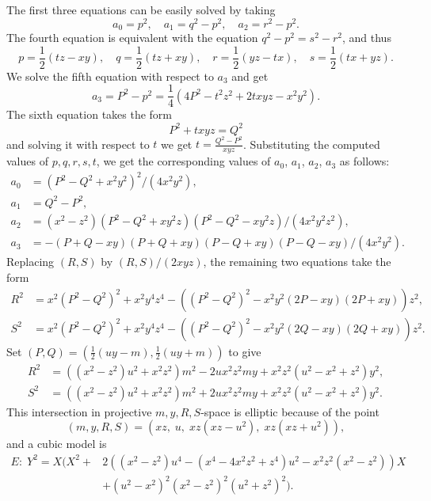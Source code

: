 \documentclass[10pt]{amsart}
\theoremstyle{plain}
\begin{document}
The first three equations can be easily solved by taking
$$
a_{0}=p^2, \quad a_{1}=q^2-p^2,\quad a_{2}=r^2-p^2.
$$
The fourth equation is equivalent with the equation $q^2-p^2=s^2-r^2$, and thus
$$
p=\frac{1}{2} (t z-x y),\quad q=\frac{1}{2} (t z+x y),\quad r=\frac{1}{2} (y z-t x),\quad s=\frac{1}{2} (t x+y z).
$$
We solve the fifth equation with respect to $a_{3}$ and get
$$
a_{3}=P^2-p^2=\frac{1}{4} \left(4 P^2-t^2 z^2+2 t x y z-x^2 y^2\right).
$$
The sixth equation takes the form
$$
P^2 + t x y z = Q^2
$$
and solving it with respect to $t$ we get $t=\frac{Q^2-P^2}{x y z}$. Substituting the computed values of $p, q, r, s, t$,
we get the corresponding values of $a_0$, $a_1$, $a_2$, $a_3$ as follows:
\begin{equation}\label{a0a1a2a3}
\begin{aligned}
	a_0 & = (P^2-Q^2+x^2y^2)^2/(4 x^2 y^2), \\
	a_1 & = Q^2-P^2, \\
	a_2 & = (x^2-z^2)(P^2-Q^2+x y^2 z)(P^2-Q^2-x y^2 z)/(4 x^2 y^2 z^2), \\
	a_3 & = -(P+Q-x y)(P+Q+x y)(P-Q+x y)(P-Q-x y)/(4 x^2y^2).
\end{aligned}
\end{equation}
Replacing 
$(R,S)$ by $(R,S)/(2 x y z)$, the remaining two equations take the form
\begin{equation}\label{sysRS}
\begin{aligned}
	R^2 & = x^2(P^2-Q^2)^2 + x^2y^4z^4 - ((P^2-Q^2)^2-x^2 y^2(2P-x y)(2P+x y
)) z^2, \\
	S^2 & = x^2(P^2-Q^2)^2 + x^2y^4z^4 - ((P^2-Q^2)^2-x^2 y^2(2Q-x y)(2Q+x y
)) z^2.
\end{aligned}
\end{equation}
Set $(P,Q) = (\frac{1}{2}(u y-m), \frac{1}{2}(u y+m))$ to give
\begin{equation}\label{RSeq}
\begin{aligned}
R^2 & = ((x^2-z^2)u^2 + x^2z^2)m^2 - 2u x^2z^2 m y + x^2z^2(u^2-x^2+z^2)y^2, \\ 
	S^2 & = ((x^2-z^2)u^2 + x^2z^2)m^2 + 2u x^2z^2 m y + x^2z^2(u^2-x^2+z^2)
y^2.
\end{aligned}
\end{equation}
This intersection in projective $m,y,R,S$-space is elliptic because of the point
\[ (m,y,R,S) = (x z, \; u, \; x z(x z-u^2), \; x z(x z+u^2)), \]
and a cubic model is 
\begin{align*}
	E: \;Y^2 =  X(X^2 + & 2( (x^2-z^2)u^4 - (x^4-4x^2z^2+z^4)u^2 -x^2z^2(x^2
-z^2)) X \\
	& + (u^2-x^2)^2 (x^2-z^2)^2 (u^2+z^2)^2).
\end{align*}
\end{document}
